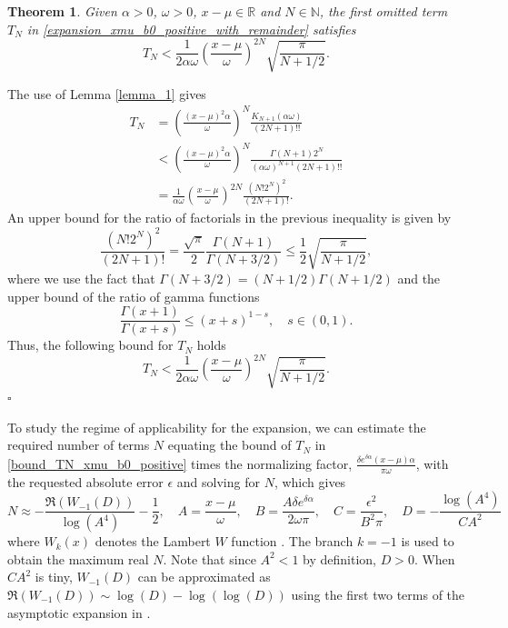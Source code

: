 \documentclass[10pt,a4paper,oneside]{article}
\newtheorem{theorem}{Theorem}[section]
\newenvironment{proof}{\noindent{\bf Proof:}}{\hfill$\square$}
\numberwithin{equation}{section}
\begin{document}
\begin{theorem}\label{theorem_expansion_xmu_b0_postivie_remainder}
Given $\alpha > 0$, $\omega > 0$, $x-\mu \in \mathbb{R}$ and $N \in \mathbb{N}$, the first omitted term $T_N$ in \eqref{expansion_xmu_b0_positive_with_remainder} satisfies
\begin{equation}\label{bound_TN_xmu_b0_positive}
T_N < \frac{1}{2\alpha\omega}\left(\frac{x-\mu}{\omega}\right)^{2N} \sqrt{\frac{\pi}{N + 1/2}}.
\end{equation}
\end{theorem}

\begin{proof}
The use of Lemma \ref{lemma_1} gives
\begin{align*}
T_N &= \left(\frac{(x-\mu)^2 \alpha}{\omega}\right)^N \frac{K_{N+1}(\alpha \omega)}{(2N +1)!!}\\
&<  \left(\frac{(x-\mu)^2 \alpha}{\omega}\right)^N \frac{\Gamma(N + 1)2^N}{(\alpha\omega)^{N + 1}(2N +1)!!}\\
&= \frac{1}{\alpha\omega}\left(\frac{x-\mu}{\omega}\right)^{2N} \frac{(N! 2^N)^2}{(2N + 1)!}.
\end{align*}
An upper bound for the ratio of factorials in the previous inequality is given by
\begin{equation*}
\frac{(N! 2^N)^2}{(2N + 1)!} = \frac{\sqrt{\pi}}{2}\frac{\Gamma(N+1)}{\Gamma(N + 3/2)} \le \frac{1}{2}\sqrt{\frac{\pi}{N + 1/2}},
\end{equation*}
where we use the fact that $\Gamma(N + 3/2) = (N + 1/2) \Gamma(N + 1/2)$ and the upper bound of the ratio of gamma functions \cite{Wendel1948}
\begin{equation}
\frac{\Gamma(x + 1)}{\Gamma(x+s)} \le (x + s)^{1-s}, \quad s \in (0, 1).
\end{equation}
Thus, the following bound for $T_N$ holds
\begin{equation}
T_N < \frac{1}{2\alpha\omega}\left(\frac{x-\mu}{\omega}\right)^{2N} \sqrt{\frac{\pi}{N + 1/2}}.
\end{equation}
\end{proof}

To study the regime of applicability for the expansion, we can estimate the required number of terms $N$ equating the bound of $T_N$ in \eqref{bound_TN_xmu_b0_positive} times the normalizing factor, $\frac{\delta e^{\delta \alpha} (x-\mu)\alpha}{\pi \omega}$, with the requested absolute error $\epsilon$ and solving for $N$, which gives
\begin{equation}\label{N_expansion_xmu_b0_positive}
N \approx -\frac{\Re(W_{-1}(D))}{\log(A^4)} - \frac{1}{2}, \quad A = \frac{x-\mu}{\omega}, \quad B = \frac{A\delta e^{\delta \alpha}}{2\omega\pi}, \quad C = \frac{\epsilon^2}{B^2 \pi}, \quad D = -\frac{\log(A^4)}{C A^2}
\end{equation}
where $W_k(x)$ denotes the Lambert $W$ function \cite[\S 4.13]{NIST:DLMF}. The branch $k=-1$ is used to obtain the maximum real $N$. Note that since $A^2 < 1$ by definition, $D > 0$. When $C A^2$ is tiny, $W_{-1}(D)$ can be approximated as $\Re(W_{-1}(D)) \sim \log(D) - \log(\log(D))$ using the first two terms of the asymptotic expansion in \cite[\S 4.13.10]{NIST:DLMF}.
\end{document}
